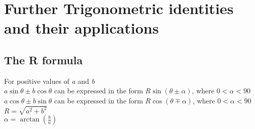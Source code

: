 \documentclass{article}[18pt]
\begin{document}
\section{Further Trigonometric identities and their applications}
\subsection{The R formula}
For positive values of \textit{a} and \textit{b}
\\
$a\sin\theta\pm b\cos\theta$ can be expressed in the form $R\sin(\theta\pm\alpha)$, where $0<\alpha<90$
\\
$a\cos\theta\pm b\sin\theta$ can be expressed in the form $R\cos(\theta\mp\alpha)$, where $0<\alpha<90$ 
\\
$R=\sqrt{a^2+b^2}$
\\
$\alpha=\arctan(\frac{b}{a})$
\end{document}
